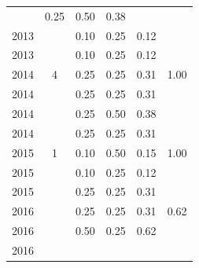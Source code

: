\begin{table}[H]
\begin{tabular}{| l | c | c | c | c | c |}
          &
          0.25
          &
          0.50
          &
          0.38
          &
          \\
            2013
          &
          
          &
          0.10
          &
          0.25
          &
          0.12
          &
          \\
            2013
          &
          
          &
          0.10
          &
          0.25
          &
          0.12
          &
          \\
\hline
            2014
          &
          4
          &
          0.25
          &
          0.25
          &
          0.31
          &
            {\color{blue} 1.00}
          \\
            2014
          &
          
          &
          0.25
          &
          0.25
          &
          0.31
          &
          \\
            2014
          &
          
          &
          0.25
          &
          0.50
          &
          0.38
          &
          \\
            2014
          &
          
          &
          0.25
          &
          0.25
          &
          0.31
          &
          \\
\hline
            2015
          &
          1
          &
          0.10
          &
          0.50
          &
          0.15
          &
            {\color{blue} 1.00}
          \\
            2015
          &
          
          &
          0.10
          &
          0.25
          &
          0.12
          &
          \\
            2015
          &
          
          &
          0.25
          &
          0.25
          &
          0.31
          &
          \\
\hline
            2016
          &
          
          &
          0.25
          &
          0.25
          &
          0.31
          &
            {\color{blue} 0.62}
          \\
            2016
          &
          
          &
          0.50
          &
          0.25
          &
          0.62
          &
          \\
            2016
          &
          

\end{tabular}
\end{table}
